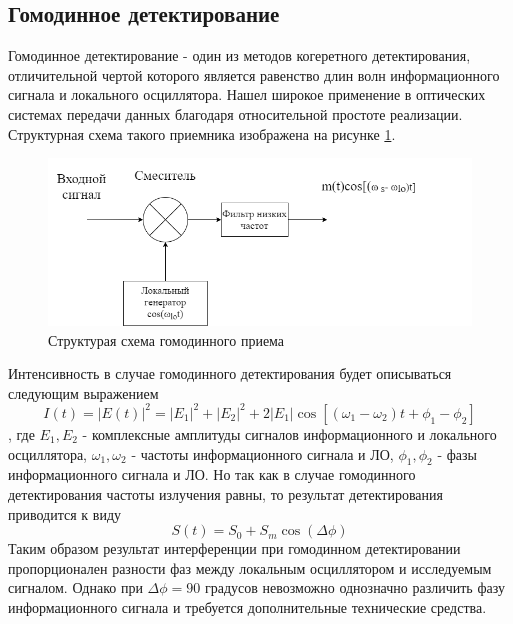\subsection{Гомодинное детектирование}\label{sec:ch1/sect3/homodyne lit}
Гомодинное детектирование - один из методов когеретного детектирования, отличительной чертой которого является равенство длин волн информационного сигнала и локального осциллятора. Нашел широкое применение в оптических системах передачи данных благодаря относительной простоте реализации. Структурная схема такого приемника изображена на рисунке \ref{fig:homodyne det lit}. 
\begin{figure}
    \centering
    \includegraphics[width=\textwidth]{images/когеретное.png}
    \caption{Структурая схема гомодинного приема}
    \label{fig:homodyne det lit}
\end{figure}

Интенсивность в случае гомодинного детектирования будет описываться следующим выражением
\begin{equation}
    I(t) =|E(t)|^2 =  |E_1|^2 + |E_2|^2 + 2|E_1|\cos[(\omega_1 - \omega_2)t + \phi_1 - \phi_2]
\end{equation}\label{eq: fiedl homodyne}, где $E_1, E_2$ - комплексные амплитуды сигналов информационного и локального осциллятора, $\omega_1, \omega_2$ - частоты информационного сигнала и ЛО, $\phi_1, \phi_2$ - фазы информационного сигнала и ЛО. 
Но так как в случае гомодинного детектирования частоты излучения равны, то результат детектирования приводится к виду 
\begin{equation}
    S(t) = S_0 + S_m\cos(\Delta\phi)
\end{equation}
Таким образом результат интерференции при гомодинном детектировании пропорционален разности фаз между локальным осциллятором и исследуемым сигналом. Однако при $\Delta\phi = 90$ градусов невозможно однозначно различить фазу информационного сигнала и требуется дополнительные технические средства.  
